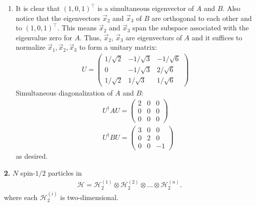 \documentclass{article}
\theoremstyle{definition}
\newcommand{\ham}{\mathcal{H}}
\begin{document}
\begin{enumerate}[label=(\alph*)]
	
	\item It is clear that $(1,0,1)^\top$ is a simultaneous eigenvector of $A$ and $B$. Also notice that the eigenvectors $\vec{x}_2$ and $\vec{x}_3$ of $B$ are orthogonal to each other and to $(1,0,1)^\top$. This means $\vec{x}_2$ and $\vec{x}_3$ span the subspace associated with the eigenvalue zero for $A$. Thus, $\vec{x}_2$, $\vec{x}_3$ are eigenvectors of $A$ and it suffices to normalize $\vec{x}_1, \vec{x}_2, \vec{x}_3$ to form a unitary matrix:
	\begin{align*}
	\boxed{U = \begin{pmatrix}
	1/\sqrt{2}  & -1/\sqrt{3} & -1/\sqrt{6}  \\
	0 & -1/\sqrt{3} & 2/\sqrt{6}   \\
	1 /\sqrt{2} & 1/\sqrt{3} & 1/\sqrt{6} 	
	\end{pmatrix}}
	\end{align*} 
	Simultaneous diagonalization of $A$ and $B$:
	\begin{align*}
	&U^\dagger A U = \begin{pmatrix}
	2 & 0 & 0 \\
	0&0&0\\
	0&0&0
	\end{pmatrix}\\
	&U^\dagger B U = \begin{pmatrix}
	3 & 0 & 0 \\
	0 & 2 & 0 \\ 
	0 & 0 & -1
	\end{pmatrix}
	\end{align*}
	as desired.
\end{enumerate}



\noindent \textbf{2. } $N$ spin-$1/2$ particles in 
\begin{align*}
\ham = \ham_2^{(1)} \otimes \ham_2^{(2)} \otimes \dots \otimes \ham_2^{(n)}.
\end{align*}
where each $\ham_2^{(i)}$ is two-dimensional.
\end{document}
